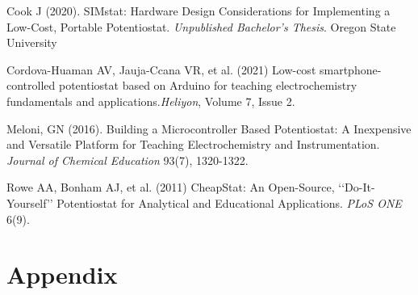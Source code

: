 \documentclass{article}
\begin{document}
Cook J (2020). SIMstat: Hardware Design Considerations for Implementing a Low-Cost, Portable Potentiostat. \emph{Unpublished Bachelor's Thesis}. Oregon State University

Cordova-Huaman AV, Jauja-Ccana VR, et al. (2021) Low-cost smartphone-controlled potentiostat based on Arduino for teaching electrochemistry fundamentals and applications.\emph{Heliyon}, Volume 7, Issue 2. 

Meloni, GN (2016). Building a Microcontroller Based Potentiostat: A Inexpensive and Versatile Platform for Teaching Electrochemistry and Instrumentation. \emph{Journal of Chemical Education} 93(7), 1320-1322. 

Rowe AA, Bonham AJ, et al. (2011) CheapStat: An Open-Source, ‘‘Do-It-Yourself’’ Potentiostat for Analytical and Educational Applications. \emph{PLoS ONE} 6(9).

\newpage
\section*{Appendix}
\end{document}
